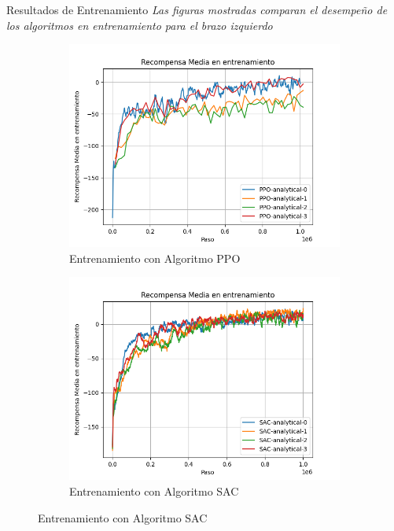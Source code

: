 \documentclass[spanish,10pt]{beamer}
\begin{document}
	\begin{frame}{Resultados de Entrenamiento}
		\textit{Las figuras mostradas comparan el desempeño de los algoritmos en entrenamiento para el brazo izquierdo}\\[1em]
		
		\begin{figure}[h!]
			\centering
			
			\begin{subfigure}[b]{0.48\textwidth}
				\centering
				\includegraphics[width=\textwidth]{images/graphs/PPO/Left/ep_rew_mean}
				\caption{Entrenamiento con Algoritmo PPO}
				\label{fig:train-ppo-rew-left}
			\end{subfigure}
			\hfill
			\begin{subfigure}[b]{0.48\textwidth}
				\centering
				\includegraphics[width=\textwidth]{images/graphs/SAC/Left/ep_rew_mean}
				\caption{Entrenamiento con Algoritmo SAC}
				\label{fig:train-sac-rew-left}
			\end{subfigure}
		\end{figure}
	\end{frame}
\end{document}
